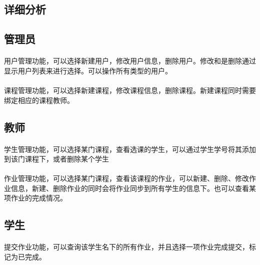 \documentclass[notitlepage,cs4size,punct,oneside]{report}
\begin{document}
\begin{CJK}{UTF8}{hei}
\section{详细分析}
\subsection{管理员}
\paragraph{}用户管理功能，可以选择新建用户，修改用户信息，删除用户。修改和是删除通过显示用户列表来进行选择。可以操作所有类型的用户。
\paragraph{}课程管理功能，可以选择新建课程，修改课程信息，删除课程。新建课程同时需要绑定相应的课程教师。
\subsection{教师}
\paragraph{}学生管理功能，可以选择某门课程，查看选课的学生，可以通过学生学号将其添加到该门课程下，或者删除某个学生
\paragraph{}作业管理功能，可以选择某门课程，查看该课程的作业，可以新建、删除、修改作业信息，新建、删除作业的同时会将作业同步到所有学生的信息下。也可以查看某项作业的完成情况。
\subsection{学生}
\paragraph{}提交作业功能，可以查询该学生名下的所有作业，并且选择一项作业完成提交，标记为已完成。

\pagebreak
\end{CJK}
\end{document}
